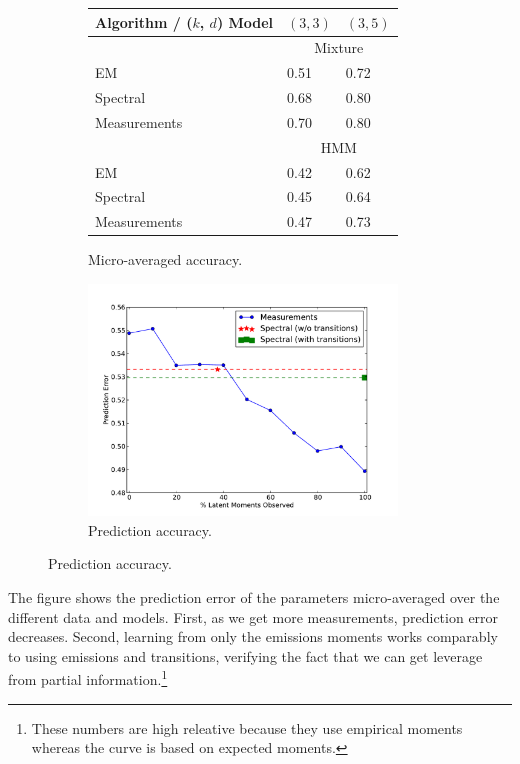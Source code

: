 \begin{figure}
  \centering
  \begin{subfigure}[b]{0.4\textwidth}
    \label{tab:errors}
    \begin{tabular}{l | l l }
        Algorithm / ($k$, $d$) Model & $(3,3)$ & $(3,5)$ \\ \hline
        & \multicolumn{2}{c}{Mixture} \\
        EM                    & 0.51 & 0.72 \\
        Spectral              & 0.68 & 0.80 \\
        Measurements  & 0.70 & 0.80 \\
        & \multicolumn{2}{c}{HMM} \\
        EM                    & 0.42 & 0.62  \\
        Spectral              & 0.45 & 0.64  \\
        Measurements  & 0.47 & 0.73
    \end{tabular}
    \caption{Micro-averaged accuracy.}
  \end{subfigure}
  \begin{subfigure}[b]{0.4\textwidth}
    \label{fig:measurements}
    \includegraphics[width=0.9\textwidth]{figures/measurements.pdf}
    \caption{Prediction accuracy.}
  \end{subfigure}
\end{figure}



The figure
shows the prediction error of the parameters
micro-averaged over the different data and models.  First, as we get more
measurements, prediction error decreases.  Second,
learning from only the emissions moments works comparably
to using emissions and transitions, verifying the fact that
we can get leverage from partial information.\footnote{
These numbers are high releative because they use empirical moments
whereas the curve is based on expected moments.}

